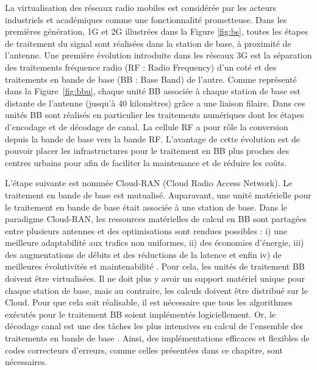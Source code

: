 La virtualisation des réseaux radio mobiles est considérée par les acteurs industriels \cite{ericsson_cloud_2015,huawei_5g:_2013} et académiques \cite{wubben_benefits_2014,rost_cloud_2014,checko_cloud_2015} comme une fonctionnalité prometteuse. Dans les premières génération, 1G et 2G illustrées dans la Figure \ref{fig:bs}, toutes les étapes de traitement du signal sont réalisées dans la station de base, à proximité de l'antenne. Une première évolution introduite dans les réseaux 3G est la séparation des traitements fréquence radio (RF : Radio Frequency) d'un coté et des traitements en bande de base (BB : Base Band) de l'autre. Comme représenté dans la Figure~\ref{fig:bbu}, chaque unité BB associée à chaque station de base est distante de l'antenne (jusqu'à 40 kilomètres) grâce a une liaison filaire. Dans ces unités BB sont réalisés en particulier les traitements numériques dont les étapes d'encodage et de décodage de canal. La cellule RF a pour rôle la conversion depuis la bande de base vers la bande RF. L'avantage de cette évolution est de pouvoir placer les infrastructures pour le traitement en BB plus proches des centres urbains pour afin de faciliter la maintenance et de réduire les coûts.

L'étape suivante est nommée Cloud-RAN (Cloud Radio Access Network). Le traitement en bande de base est mutualisé. Auparavant, une unité matérielle pour le traitement en bande de base était associée à une station de base. Dans le paradigme Cloud-RAN, les ressources matérielles de calcul en BB sont partagées entre plusieurs antennes et des optimisations sont rendues possibles : i) une meilleure adaptabilité aux trafics non uniformes, ii) des économies d'énergie, iii) des augmentations de débits et des réductions de la latence et enfin iv) de meilleures évolutivités et maintenabilité \cite{checko_cloud_2015}. Pour cela, les unités de traitement BB doivent être virtualisées. Il ne doit plus y avoir un support matériel unique pour chaque station de base, mais au contraire, les calculs doivent être distribué sur le Cloud. Pour que cela soit réalisable, il est nécessaire que tous les algorithmes exécutés pour le traitement BB soient implémentés logiciellement. Or, le décodage canal est une des tâches les plus intensives en calcul de l'ensemble des traitements en bande de base \cite{rodriguez_towards_2017,nikaein_processing_2015}. Ainsi, des implémentations efficaces et flexibles de codes correcteurs d'erreurs, comme celles présentées dans ce chapitre, sont nécessaires.

